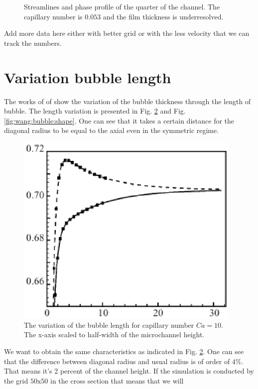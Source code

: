 \documentclass{article}
\begin{document}
\begin{figure}
\caption{Streamlines and phase profile of the quarter of the channel. The capillary number is
$0.053$ and the film thickness is underresolved. \label{fig:quarter:capillary:capillary01}}
\end{figure}
{\color{red} Add more data here either with better grid or with the less velocity that we can
track the numbers.}


\section{Variation bubble length}
The works of \citet{heil-threedim} of \citet{wang-non-circular} show the variation of the bubble
thickness through the length of
bubble. The length variation is presented in Fig. \ref{fig:thickness:variation:ca:ten} and
Fig.\ref{fig:wang:bubble:shape}. One can see that it takes a certain distance for the diagonal
radius to be equal to the axial even in the symmetric regime.
\begin{figure}
\includegraphics[width=0.97\textwidth]{Figures/variationoverlength.eps}
\caption{The variation of the bubble length for capillary number $Ca=10$. The x-axis scaled to
half-width of the microchannel height.  \label{fig:thickness:variation:ca:ten}}
\end{figure}
We want to obtain the same characteristics as indicated in Fig.
\ref{fig:thickness:variation:ca:ten}. One can see that the difference between diagonal radius and
usual radius is of order of $4\%$. That means it's 2 percent of the channel height. If the
simulation is conducted by the grid $50\mathrm{x}50$ in the cross section that means that we will
\end{document}

